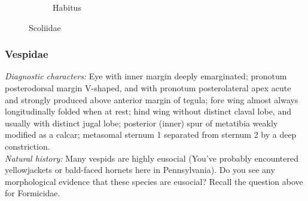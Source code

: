 \documentclass[letterpaper, 11pt]{article}
\begin{document}
\begin{figure}[ht!]
\begin{subfigure}[ht!]{0.38\textwidth}
        \caption{Habitus \citep[][Fig. 78]{goulet1993hymenoptera}}
        \label{fig:scoliid2}
    \end{subfigure}
    \caption{Scoliidae}\label{fig:scoliids}
\end{figure}

\subsubsection{Vespidae}
\noindent{}\textit{Diagnostic characters:} Eye with inner margin deeply emarginated; pronotum posterodorsal margin V-shaped, and with pronotum posterolateral apex acute and strongly produced above anterior margin of tegula; fore wing almost always longitudinally folded when at rest; hind wing without distinct claval lobe, and usually with distinct jugal lobe; posterior (inner) spur of metatibia weakly modified as a calcar; metasomal sternum 1 separated from sternum 2 by a deep constriction.\\

\noindent{}\textit{Natural history:} Many vespids are highly eusocial (You've probably encountered yellowjackets or bald-faced hornets here in Pennsylvania). Do you see any morphological evidence that these species are eusocial? Recall the question above for Formicidae.\\
\end{document}
